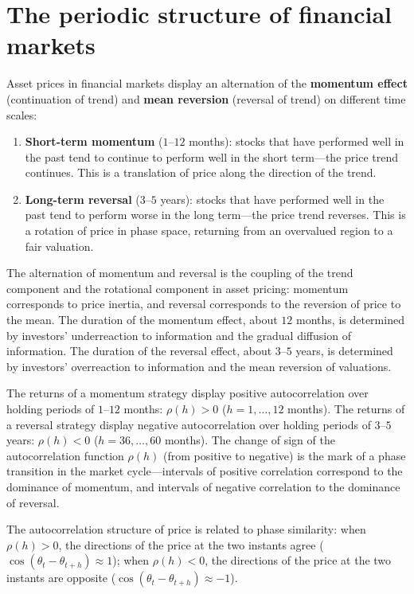 \section{The periodic structure of financial markets}

\begin{definition}\label{def:momentum_reversal}
Asset prices in financial markets display an alternation of the \textbf{momentum effect} (continuation of trend) and \textbf{mean reversion} (reversal of trend) on different time scales:
\begin{enumerate}[label=(\roman*)]
    \item \textbf{Short-term momentum} ($1$--$12$ months): stocks that have performed well in the past tend to continue to perform well in the short term---the price trend continues. This is a translation of price along the direction of the trend.
    \item \textbf{Long-term reversal} ($3$--$5$ years): stocks that have performed well in the past tend to perform worse in the long term---the price trend reverses. This is a rotation of price in phase space, returning from an overvalued region to a fair valuation.
\end{enumerate}
The alternation of momentum and reversal is the coupling of the trend component and the rotational component in asset pricing: momentum corresponds to price inertia, and reversal corresponds to the reversion of price to the mean. The duration of the momentum effect, about $12$ months, is determined by investors' underreaction to information and the gradual diffusion of information. The duration of the reversal effect, about $3$--$5$ years, is determined by investors' overreaction to information and the mean reversion of valuations.
\end{definition}

\begin{proposition}\label{prop:momentum_autocorr}
The returns of a momentum strategy display positive autocorrelation over holding periods of $1$--$12$ months: $\rho(h) > 0$ ($h = 1,\dots,12$ months). The returns of a reversal strategy display negative autocorrelation over holding periods of $3$--$5$ years: $\rho(h) < 0$ ($h = 36,\dots,60$ months). The change of sign of the autocorrelation function $\rho(h)$ (from positive to negative) is the mark of a phase transition in the market cycle---intervals of positive correlation correspond to the dominance of momentum, and intervals of negative correlation to the dominance of reversal.

The autocorrelation structure of price is related to phase similarity: when $\rho(h) > 0$, the directions of the price at the two instants agree ($\cos(\theta_t - \theta_{t+h}) \approx 1$); when $\rho(h) < 0$, the directions of the price at the two instants are opposite ($\cos(\theta_t - \theta_{t+h}) \approx -1$).
\end{proposition}

